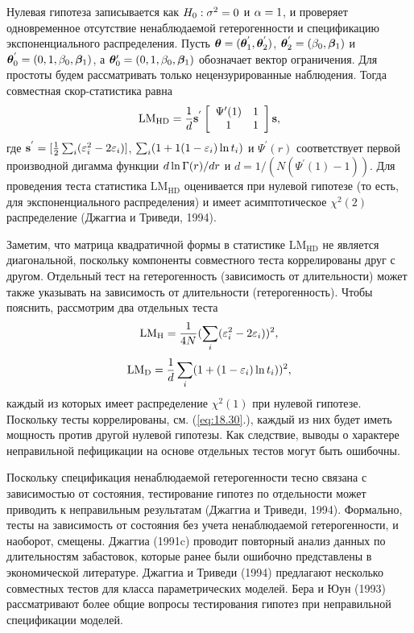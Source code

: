 Нулевая гипотеза записывается как $H_0: \sigma^2 = 0$ и $\alpha = 1$, и проверяет одновременное отсутствие ненаблюдаемой гетерогенности и спецификацию экспоненциального распределения. Пусть $\bm{\theta} = (\bm{\theta}^{'}_1, \bm{\theta}^{'}_2)$, $\bm{\theta}^{'}_2 = (\beta_0, \bm{\beta}_1)$ и $\bm{\theta}^{'}_0 = (0,1,\beta_0,\bm{\beta}_1)$, а $\bm{\theta}'_0 = (0, 1, \beta_0, \bm{\beta}_1)$ обозначает вектор ограничения. Для простоты будем рассматривать только нецензурированные наблюдения. Тогда совместная скор-статистика равна
    \begin{align}
        \label{eq:18.30}
        \mathrm{LM}_{\mathrm{HD}} = \frac{1}{d}\mathbf{s}^{'}\left[ \begin{array}{cc}
        \Psi'(1) & 1 \\
        1        & 1
        \end{array} \right] \mathbf{s},
    \end{align}
где $\mathbf{s}^{'} = [\frac{1}{2}\sum_i(\varepsilon^{2}_{i} - 2\varepsilon_i)]$, $\sum_i(1+1(1-\varepsilon_i)\ln t_i)$ и $\Psi^{'}(r)$ соответствует первой производной дигамма функции $d\ln\Gamma(r)/dr$ и $d = 1/(N(\Psi^{'}(1) - 1))$. Для проведения теста статистика $\mathrm{LM}_{\mathrm{HD}}$ оценивается при нулевой гипотезе (то есть, для экспоненциального распределения) и имеет асимптотическое $\chi^2(2)$ распределение (Джаггиа и Триведи, 1994).

Заметим, что матрица квадратичной формы в статистике $\mathrm{LM}_{\mathrm{HD}}$ не является диагональной, поскольку компоненты совместного теста коррелированы друг с другом. Отдельный тест на гетерогенность (зависимость от длительности) может также указывать на зависимость от длительности (гетерогенность). %
Чтобы пояснить, рассмотрим два отдельных теста
    \begin{align}
        \label{eq:18.31}
        \mathrm{LM}_{\mathrm{H}} = \frac{1}{4N}(\sum_i(\varepsilon^{2}_{i} - 2\varepsilon_i))^2,
    \end{align}
    \begin{align}
        \label{eq:18.32}
        \mathrm{LM}_{\mathrm{D}} = \frac{1}{d}\sum_i(1 + (1-\varepsilon_i)\ln t_i))^2,
    \end{align}
каждый из которых имеет распределение $\chi^2(1)$ при нулевой гипотезе. Поскольку тесты коррелированы, см. (\ref{eq:18.30}.), каждый из них будет иметь мощность против другой нулевой гипотезы. Как следствие, выводы о характере неправильной пефицикации на основе отдельных тестов могут быть ошибочны.

Поскольку спецификация ненаблюдаемой гетерогенности тесно связана с зависимостью от состояния, тестирование гипотез по отдельности может приводить к неправильным результатам (Джаггиа и Триведи, 1994). Формально, тесты на зависимость от состояния без учета ненаблюдаемой гетерогенности, и наоборот, смещены. Джаггиа (1991c) проводит повторный анализ данных по длительностям забастовок, которые ранее были ошибочно представлены в экономической литературе. Джаггиа и Триведи (1994) предлагают несколько совместных тестов для класса параметрических моделей. Бера и Юун (1993) рассматривают более общие вопросы тестирования гипотез при неправильной спецификации моделей.

